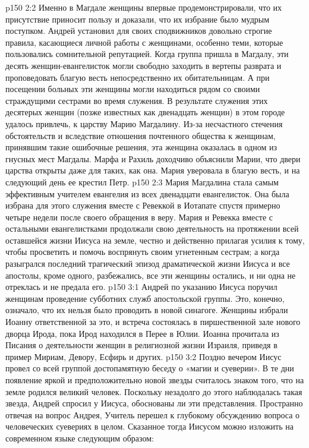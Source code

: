 \vs p150 2:2 Именно в Магдале женщины впервые продемонстрировали, что их присутствие приносит пользу и доказали, что их избрание было мудрым поступком. Андрей установил для своих сподвижников довольно строгие правила, касающиеся личной работы с женщинами, особенно теми, которые пользовались сомнительной репутацией. Когда группа пришла в Магдалу, эти десять женщин\hyp{}евангелисток могли свободно заходить в вертепы разврата и проповедовать благую весть непосредственно их обитательницам. А при посещении больных эти женщины могли находиться рядом со своими страждущими сестрами во время служения. В результате служения этих десятерых женщин (позже известных как двенадцать женщин) в этом городе удалось привлечь, к царству Марию Магдалину. Из\hyp{}за несчастного стечения обстоятельств и вследствие отношения почтенного общества к женщинам, принявшим такие ошибочные решения, эта женщина оказалась в одном из гнусных мест Магдалы. Марфа и Рахиль доходчиво объяснили Марии, что двери царства открыты даже для таких, как она. Мария уверовала в благую весть, и на следующий день ее крестил Петр.
\vs p150 2:3 Мария Магдалина стала самым эффективным учителем евангелия из всех двенадцати евангелисток. Она была избрана для этого служения вместе с Ревеккой в Иотапате спустя примерно четыре недели после своего обращения в веру. Мария и Ревекка вместе с остальными евангелистками продолжали свою деятельность на протяжении всей оставшейся жизни Иисуса на земле, честно и действенно прилагая усилия к тому, чтобы просветить и помочь воспрянуть своим угнетенным сестрам; а когда разыгрался последний трагический эпизод драматической жизни Иисуса и все апостолы, кроме одного, разбежались, все эти женщины остались, и ни одна не отреклась и не предала его.
\vs p150 3:1 Андрей по указанию Иисуса поручил женщинам проведение субботних служб апостольской группы. Это, конечно, означало, что их нельзя было проводить в новой синагоге. Женщины избрали Иоанну ответственной за это, и встреча состоялась в пиршественной зале нового дворца Ирода, пока Ирод находился в Перее в Юлии. Иоанна прочитала из Писания о деятельности женщин в религиозной жизни Израиля, приведя в пример Мириам, Девору, Есфирь и других.
\vs p150 3:2 \pc Поздно вечером Иисус провел со всей группой достопамятную беседу о «магии и суеверии». В те дни появление яркой и предположительно новой звезды считалось знаком того, что на земле родился великий человек. Поскольку незадолго до этого наблюдалась такая звезда, Андрей спросил у Иисуса, обоснованы ли эти представления. Пространно отвечая на вопрос Андрея, Учитель перешел к глубокому обсуждению вопроса о человеческих суевериях в целом. Сказанное тогда Иисусом можно изложить на современном языке следующим образом:
